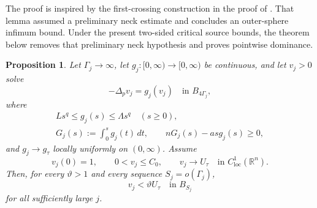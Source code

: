 \documentclass[reqno,12pt]{amsart}
\numberwithin{equation}{section}
\newtheorem{prop}[thm]{Proposition}
\theoremstyle{remark}
\newcommand{\R}{\mathbb R}
\newcommand{\dd}{\,d}
\newcommand{\loc}{\mathrm{loc}}
\begin{document}
The proof is inspired by the first-crossing construction in the proof of \cite[Lemma~3.7]{QZ2026}.
That lemma assumed a preliminary neck estimate and concludes an outer-sphere infimum bound.  Under the present two-sided critical source bounds, the theorem below removes that preliminary neck hypothesis and proves pointwise dominance.

\begin{prop} \label{prop:first-contact}
Let $\Gamma_j\to\infty$, let $g_j:[0,\infty)\to[0,\infty)$ be continuous, and let $v_j>0$ solve
\begin{equation}\label{eq:equation-vj}
-\Delta_pv_j=g_j(v_j) \quad\text{in }B_{4\Gamma_j},
\end{equation}
where
\begin{equation}\label{eq:source-fj}
\begin{gathered}
Ls^q\le g_j(s)\le\Lambda s^q\quad(s\ge0),\\
G_j(s):=\int_0^sg_j(t)\dd t,
\qquad
nG_j(s)-a s g_j(s)\ge0,
\end{gathered}
\end{equation}
and $g_j\to g_\tau$ locally uniformly on $(0,\infty)$.  Assume
$$
v_j(0)=1, \qquad 0<v_j\le C_0, \qquad
v_j\to U_\tau \quad\text{in }C^1_{\loc}(\R^n).
$$
Then, for every $\vartheta>1$ and every sequence
$S_j=o(\Gamma_j)$,
\begin{equation}\label{eq:first-contact-conclusion}
v_j<\vartheta U_\tau
\quad\text{in }B_{S_j}
\end{equation}
for all sufficiently large $j$.
\end{prop}
\end{document}
